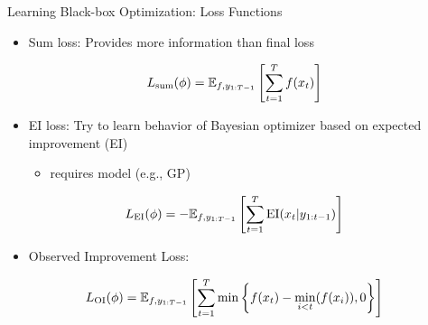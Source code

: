 \begin{frame}[c]{Learning Black-box Optimization: Loss Functions\newline {}}

\begin{itemize}
\item Sum loss: Provides more information than final loss
\end{itemize}
\begin{equation}
L_{\text{sum}}(\phi) = \mathbb{E}_{f,y_{1:T-1}}\left[\sum_{t=1}^T f(x_t)\right]\nonumber
\end{equation}

\pause

\begin{itemize}
\item EI loss: Try to learn behavior of Bayesian optimizer based on expected improvement (EI)
\begin{itemize}
\item requires model (e.g., GP)
\end{itemize}
\end{itemize}
\begin{equation}
L_{\text{EI}}(\phi) = - \mathbb{E}_{f,y_{1:T-1}}\left[\sum_{t=1}^T \text{EI}(x_t | y_{1:t-1})\right]\nonumber
\end{equation}

\pause

\begin{itemize}
\item Observed Improvement Loss:
\end{itemize}

\begin{equation}
L_{\text{OI}}(\phi) = \mathbb{E}_{f,y_{1:T-1}}\left[\sum_{t=1}^T \min \left\{f(x_t) - \min_{i<t}(f(x_i)),0 \right\}  \right]\nonumber
\end{equation}

\end{frame}

